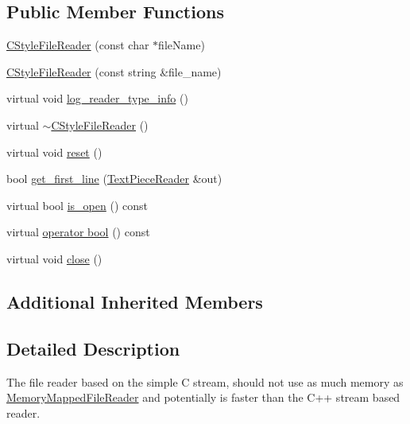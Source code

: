 \subsection*{Public Member Functions}
\begin{DoxyCompactItemize}
\item 
\hyperlink{classuva_1_1utils_1_1file_1_1_c_style_file_reader_a1f1afbb4974b327af7d5960023542d95}{C\+Style\+File\+Reader} (const char $\ast$file\+Name)
\item 
\hyperlink{classuva_1_1utils_1_1file_1_1_c_style_file_reader_a808ed1a5d432c9def3d393fd252fdf3c}{C\+Style\+File\+Reader} (const string \&file\+\_\+name)
\item 
virtual void \hyperlink{classuva_1_1utils_1_1file_1_1_c_style_file_reader_a594a0da55742cdf04cf9692d315e05a6}{log\+\_\+reader\+\_\+type\+\_\+info} ()
\item 
virtual \hyperlink{classuva_1_1utils_1_1file_1_1_c_style_file_reader_af412a6b9a818c84e7ee11097435fb2de}{$\sim$\+C\+Style\+File\+Reader} ()
\item 
virtual void \hyperlink{classuva_1_1utils_1_1file_1_1_c_style_file_reader_ac0258733f8adedc2c5f86fb1c78e5ef9}{reset} ()
\item 
bool \hyperlink{classuva_1_1utils_1_1file_1_1_c_style_file_reader_a9d7ab7a14b19845d2d06388ed8910f35}{get\+\_\+first\+\_\+line} (\hyperlink{classuva_1_1utils_1_1file_1_1_text_piece_reader}{Text\+Piece\+Reader} \&out)
\item 
virtual bool \hyperlink{classuva_1_1utils_1_1file_1_1_c_style_file_reader_aae061d3e441095547868320768960e7f}{is\+\_\+open} () const 
\item 
virtual \hyperlink{classuva_1_1utils_1_1file_1_1_c_style_file_reader_ae56b27fbcd319d297fa2c22bcffc8c35}{operator bool} () const 
\item 
virtual void \hyperlink{classuva_1_1utils_1_1file_1_1_c_style_file_reader_a2cabd630ad3964e0fc22d18232efff8b}{close} ()
\end{DoxyCompactItemize}
\subsection*{Additional Inherited Members}


\subsection{Detailed Description}
The file reader based on the simple C stream, should not use as much memory as \hyperlink{classuva_1_1utils_1_1file_1_1_memory_mapped_file_reader}{Memory\+Mapped\+File\+Reader} and potentially is faster than the C++ stream based reader. 

